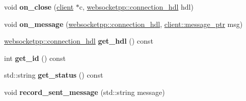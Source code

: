 \begin{DoxyCompactItemize}
\item 
void {\bfseries on\+\_\+close} (\hyperlink{classwebsocketpp_1_1client}{client} $\ast$c, \hyperlink{namespacewebsocketpp_a6b3d26a10ee7229b84b776786332631d}{websocketpp\+::connection\+\_\+hdl} hdl)\hypertarget{classconnection__metadata_ac297cf7710d8d510ef383b7395222ce5}{}\label{classconnection__metadata_ac297cf7710d8d510ef383b7395222ce5}

\item 
void {\bfseries on\+\_\+message} (\hyperlink{namespacewebsocketpp_a6b3d26a10ee7229b84b776786332631d}{websocketpp\+::connection\+\_\+hdl}, \hyperlink{classwebsocketpp_1_1endpoint_a585ecbbfd9689d4e4229e4c8378bd672}{client\+::message\+\_\+ptr} msg)\hypertarget{classconnection__metadata_a78708ddd026fc4fbff883477c0ed01bf}{}\label{classconnection__metadata_a78708ddd026fc4fbff883477c0ed01bf}

\item 
\hyperlink{namespacewebsocketpp_a6b3d26a10ee7229b84b776786332631d}{websocketpp\+::connection\+\_\+hdl} {\bfseries get\+\_\+hdl} () const\hypertarget{classconnection__metadata_a76a6a10e9192cd0ca03e2a2539cf4549}{}\label{classconnection__metadata_a76a6a10e9192cd0ca03e2a2539cf4549}

\item 
int {\bfseries get\+\_\+id} () const\hypertarget{classconnection__metadata_a3f71fbb092ec54e496464e42d960a22d}{}\label{classconnection__metadata_a3f71fbb092ec54e496464e42d960a22d}

\item 
std\+::string {\bfseries get\+\_\+status} () const\hypertarget{classconnection__metadata_aefe28a6b0b27076c685d66727e0f0a9d}{}\label{classconnection__metadata_aefe28a6b0b27076c685d66727e0f0a9d}

\item 
void {\bfseries record\+\_\+sent\+\_\+message} (std\+::string message)\hypertarget{classconnection__metadata_aa6940efad5f50a3e4f9789d51ebbea75}{}\label{classconnection__metadata_aa6940efad5f50a3e4f9789d51ebbea75}

\end{DoxyCompactItemize}
